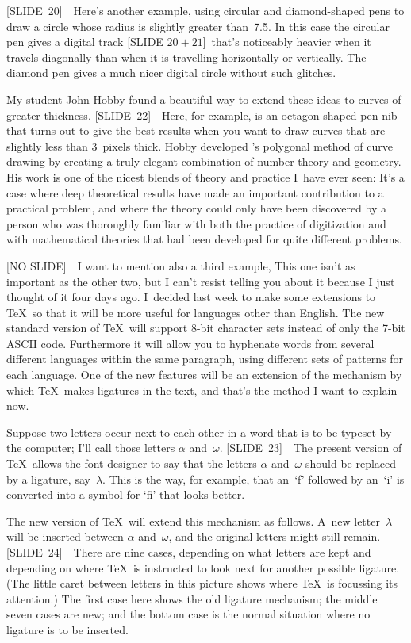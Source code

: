 [SLIDE~20]\ \  Here's another example, using circular and
diamond-shaped pens to draw a circle whose radius is slightly greater
than~7.5. In this case the circular pen gives a digital track [SLIDE
$20+21$]\  that's noticeably heavier when it travels diagonally than
when it is travelling horizontally or vertically. The diamond pen
gives a much nicer digital circle without such glitches.

My student John Hobby found a beautiful way to extend  these ideas  to
curves of greater thickness. [SLIDE~22]\ \ Here, for example, is an
octagon-shaped pen nib that turns out to give the best results when
you want to draw curves that are slightly less than 3~pixels thick.
Hobby developed \MF's polygonal method of curve drawing by creating a
truly elegant combination of number theory and geometry. His work
is one of the nicest blends of theory and practice I~have ever seen:
It's a case where deep theoretical results have made an important
contribution to a practical problem, and where the theory could only
have been discovered by a person who was thoroughly familiar with both
the practice of digitization and with mathematical theories that had
been developed for quite different problems.

[NO SLIDE]\ \ I want to mention also a third example, This one isn't as
important as the other two, but I can't resist telling you about it
because I just thought of it four days ago. I~decided last week to
make some extensions to \TeX\ so that it will be more useful for
languages other than English. The new standard version of \TeX\ will
support 8-bit character sets instead of only the 7-bit ASCII code.
Furthermore it will allow you to hyphenate words from several
different languages within the same paragraph, using different sets of
patterns for each language. One of the new features will be an
extension of the mechanism by which \TeX\ makes ligatures in the text,
and that's the method I want to explain now.

Suppose two letters occur next to each other in a word that is to be
typeset by the computer; I'll call those letters $\alpha$
and~$\omega$.
[SLIDE~23]\ \ The present version of \TeX\ allows the font designer to
say that the letters $\alpha$ and~$\omega$ should be replaced by a
ligature, say~$\lambda$. This is the way, for example, that an~`f'
followed by an~`i' is converted into a symbol for `fi' that looks
better.

The new version of \TeX\ will extend this mechanism as follows. A~new
letter~$\lambda$ will be inserted between $\alpha$ and~$\omega$, and
the original letters might still remain. [SLIDE~24]\ \  There are nine
cases, depending on what letters are kept and depending on where \TeX\
is instructed to look next for another possible ligature. (The little
caret between letters in this picture shows where \TeX\ is focussing
its attention.) The first case here shows the old ligature mechanism;
the middle seven cases are new; and the bottom case is the normal
situation where no ligature is to be inserted.


